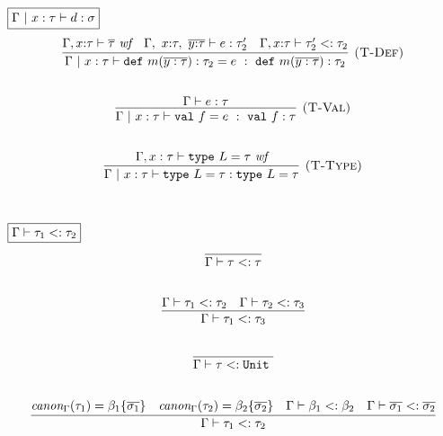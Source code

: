 \documentclass{article}
\newcommand{\keywadj}[1]{\mathtt{#1}}
\newcommand{\keyw}[1]{\keywadj{#1}~}
\begin{document}
$\fbox{$\Gamma ~|~ x:\tau \vdash d : \sigma$}$
\[
\begin{array}{c}
\infer[\textsc{(T-Def)}]
  {\Gamma  ~|~ x:\tau \vdash \keyw{def} m(\overline{y : \tau}) : \tau_2 = e~:~\keyw{def} m(\overline{y : \tau}) : \tau_2}
  {\Gamma, x{:}\tau \vdash \overline{\tau}~\textit{wf} & \Gamma,~x{:}\tau,~\overline{y{:}\tau} \vdash e : \tau_2' & \Gamma, x{:}\tau \vdash \tau_2' <: \tau_2}\\[5ex]

\infer[\textsc{(T-Val)}]
  {\Gamma ~|~ x:\tau \vdash \keyw{val} f = e~:~\keyw{val} f : \tau}
  {\Gamma \vdash e : \tau}\\[5ex]

\infer[\textsc{(T-Type)}]
  {\Gamma ~|~ x:\tau \vdash \keyw{type} L = \tau : \keyw{type} L = \tau}
  {\Gamma, x:\tau \vdash \keyw{type} L = \tau~\textit{wf}}\\[5ex]

\end{array}
\]

$\fbox{$\Gamma \vdash \tau_1 <: \tau_2$}$
\[
\begin{array}{c}

\infer
  {\Gamma \vdash \tau <: \tau}
  {}\\[5ex]

\infer
  {\Gamma \vdash \tau_1 <: \tau_3}
  {\Gamma \vdash \tau_1 <: \tau_2 & \Gamma \vdash \tau_2 <: \tau_3}\\[5ex]

\infer
  {\Gamma \vdash \tau <: \keyw{Unit} }
  {}\\[5ex]

\infer
  {\Gamma \vdash \tau_1 <: \tau_2}
  {\textit{canon}_\Gamma(\tau_1) = \beta_1\{\overline{\sigma_1}\} & \textit{canon}_\Gamma(\tau_2) = \beta_2\{\overline{\sigma_2}\} & \Gamma \vdash \beta_1 <: \beta_2 & \Gamma \vdash \overline{\sigma_1} <: \overline{\sigma_2}}\\[5ex]

\end{array}
\]
\end{document}
